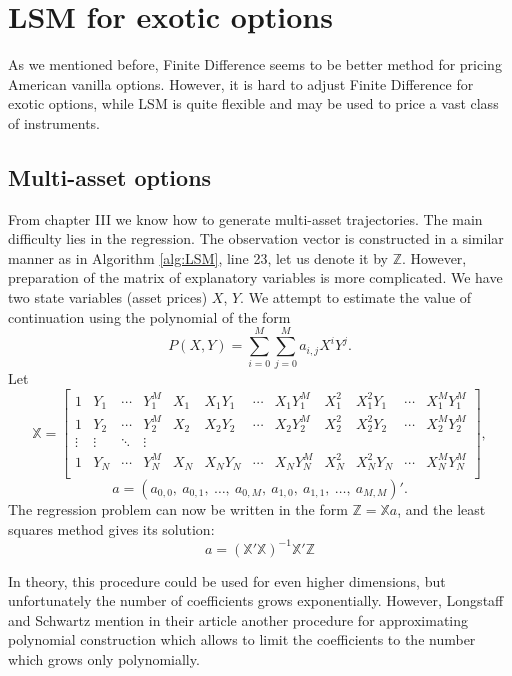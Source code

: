 \documentclass[a4paper,11pt, twoside]{book}
\theoremstyle{definition}
\theoremstyle{remark}
\begin{document}
\section{LSM for exotic options}
As we mentioned before, Finite Difference seems to be better method for pricing American vanilla options. However, it is hard to adjust Finite Difference for exotic options, while LSM is quite flexible and may be used to price a vast class of instruments.
\subsection{Multi-asset options}
From chapter III we know how to generate multi-asset trajectories. The main difficulty lies in the regression. The observation vector is constructed in a similar manner as in Algorithm \ref{alg:LSM}, line 23, let us denote it by $\mathbb{Z}$. However, preparation of the matrix of explanatory variables is more complicated. We have two state variables (asset prices) $X$, $Y$. We attempt to estimate the value of continuation using the polynomial of the form 
\[ P(X,Y) = \sum\limits_{i=0}^M \sum\limits_{j=0}^M a_{i,j} X^i Y^j. \]
Let
\begin{equation*}
 \mathbb{X} = \left[ \begin{array}{cccccccccccc}
           1 & Y_1 & \cdots & Y_1^M & X_1 & X_1 Y_1 & \cdots & X_1 Y_1^M & X_1^2 & X_1^2 Y_1 & \cdots & X_1^M Y_1^M \\
           1 & Y_2 & \cdots & Y_2^M & X_2 & X_2 Y_2 & \cdots & X_2 Y_2^M & X_2^2 & X_2^2 Y_2 & \cdots & X_2^M Y_2^M \\
           \vdots & \vdots & \ddots & \vdots \\
           1 & Y_N & \cdots & Y_N^M & X_N & X_N Y_N & \cdots & X_N Y_N^M & X_N^2 & X_N^2 Y_N & \cdots & X_N^M Y_N^M \\
          \end{array} \right],
\end{equation*}
\[ a = (a_{0,0},\ a_{0,1},\ \ldots,\ a_{0,M},\ a_{1,0},\ a_{1,1},\ \ldots,\ a_{M,M})'. \]
The regression problem can now be written in the form $\mathbb{Z} = \mathbb{X} a $, and the least squares method gives its solution:
\[ a = (\mathbb{X}'\mathbb{X})^{-1}\mathbb{X}' \mathbb{Z} \]

In theory, this procedure could be used for even higher dimensions, but unfortunately the number of coefficients grows exponentially. However, Longstaff and Schwartz mention in their article another procedure for approximating polynomial construction which allows to limit the coefficients to the number which grows only polynomially. 
\end{document}
